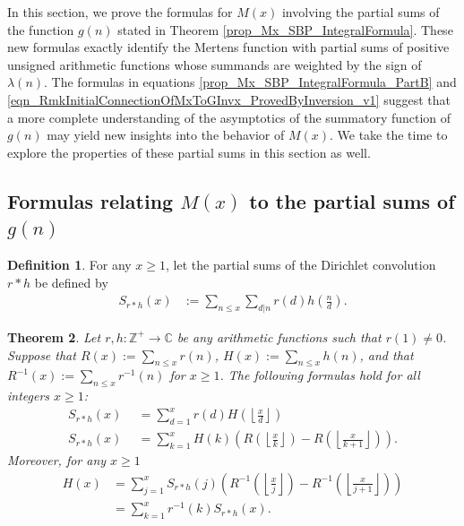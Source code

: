 \documentclass[11pt,reqno,a4letter]{article}
\newcommand{\hlocalref}[1]{\hyperref[#1]{\ref{#1}}}
\numberwithin{equation}{section}
\numberwithin{figure}{section}
\numberwithin{table}{section}
\newcommand{\Floor}[2]{\ensuremath{\left\lfloor \frac{#1}{#2} \right\rfloor}}
\theoremstyle{plain}
\newtheorem{theorem}{Theorem}
\numberwithin{theorem}{section}
\theoremstyle{definition}
\newtheorem{definition}[theorem]{Definition}
\begin{document}
In this section, we prove the formulas for $M(x)$ involving the partial sums 
of the function $g(n)$ stated in 
Theorem \hlocalref{prop_Mx_SBP_IntegralFormula}. 
These new formulas exactly identify the Mertens function with partial sums of 
positive unsigned arithmetic functions whose summands are 
weighted by the sign of $\lambda(n)$. 
The formulas in equations 
\eqref{prop_Mx_SBP_IntegralFormula_PartB} and 
\eqref{eqn_RmkInitialConnectionOfMxToGInvx_ProvedByInversion_v1} 
suggest that a more complete understanding of the 
asymptotics of the summatory function of $g(n)$ 
may yield new insights into the behavior of $M(x)$. 
We take the time to explore the properties of these partial sums in 
this section as well. 

\subsection{Formulas relating $M(x)$ to the partial sums of $g(n)$} 
\label{subSection_KeyApplications_NewExactFormulasForMx} 

\begin{definition}
For any $x \geq 1$, let the partial sums of the Dirichlet convolution $r \ast h$ be defined by 
\begin{align*} 
S_{r \ast h}(x) & := \sum_{n \leq x} \sum_{d|n} r(d) h\left(\frac{n}{d}\right). 
\end{align*}
\end{definition}

\begin{theorem} 
\label{theorem_SummatoryFuncsOfDirCvls} 
Let $r,h: \mathbb{Z}^{+} \rightarrow \mathbb{C}$ be any 
arithmetic functions such that $r(1) \neq 0$. 
Suppose that $R(x) := \sum_{n \leq x} r(n)$, $H(x) := \sum_{n \leq x} h(n)$, and that 
$R^{-1}(x) := \sum_{n \leq x} r^{-1}(n)$ for $x \geq 1$. 
The following formulas hold for all integers $x \geq 1$: 
\begin{align*} 
S_{r \ast h}(x) & \phantom{:}= \sum_{d=1}^x r(d) H\left(\Floor{x}{d}\right) \\ 
S_{r \ast h}(x) & \phantom{:}= \sum_{k=1}^{x} H(k) \left(R\left(\Floor{x}{k}\right) - 
     R\left(\Floor{x}{k+1}\right)\right). 
\end{align*} 
Moreover, for any $x \geq 1$ 
\begin{align*} 
H(x) & = \sum_{j=1}^{x} S_{r \ast h}(j) \left(R^{-1}\left(\Floor{x}{j}\right) - 
     R^{-1}\left(\Floor{x}{j+1}\right)\right) \\ 
     & = \sum_{k=1}^{x} r^{-1}(k) S_{r \ast h}(x). 
\end{align*} 
\end{theorem} 
\end{document}
